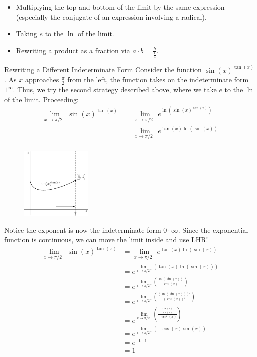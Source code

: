 \begin{itemize}
\item Multiplying the top and bottom of the limit by the same expression (especially the conjugate of an expression involving a radical).
\item Taking $e$ to the $\ln$ of the limit.
\item Rewriting a product as a fraction via $a\cdot b = \frac{b}{\frac{1}{a}}$.
\end{itemize}
\begin{example}{Rewriting a Different Indeterminate Form}
 Consider the function $\sin(x)^{\tan(x)}$.  As $x$ approaches $\frac{\pi}{2}$ from the left, the function takes on the indeterminate form $1^\infty$.  Thus, we try the second strategy described above, where we take $e$ to the $\ln$ of the limit.  Proceeding:
 \begin{align*}
 \lim_{x\rightarrow \pi/2^-}\sin(x)^{\tan(x)}&= \lim_{x\rightarrow \pi/2^-}e^{\ln\left(\sin(x)^{\tan(x)}\right)}\\
 &=\lim_{x\rightarrow \pi/2^-}e^{\tan(x)\ln\left(\sin(x)\right)}\\
 \end{align*}
 
\begin{figure}
 \begin{center}
 	\includegraphics[width=0.3\textwidth]{ChapterGeom/Figures/LHR-SinetoTan}
 \end{center}
\end{figure}

Notice the exponent is now the indeterminate form $0\cdot\infty$.  Since the exponential function is continuous, we can move the limit inside and use LHR!
\begin{align*}
 \lim_{x\rightarrow \pi/2^-}\sin(x)^{\tan(x)}
 &=\lim_{x\rightarrow \pi/2^-}e^{\tan(x)\ln\left(\sin(x)\right)}\\
 &=e^{\lim_{x\rightarrow \pi/2^-}\left(\tan(x)\ln\left(\sin(x)\right)\right)}\\
 &=e^{\lim_{x\rightarrow \pi/2^-}\left(\frac{\ln\left(\sin(x)\right)}{\cot(x)}\right)}\\
 &=e^{\lim_{x\rightarrow \pi/2^-}\left(\frac{\left(\ln\left(\sin(x)\right)\right)'}{\left(\cot(x)\right)'}\right)}\\
 &=e^{\lim_{x\rightarrow \pi/2^-}\left(\frac{\frac{\cos(x)}{\sin(x)}}{-\csc^2(x)}\right)}\\
 &=e^{\lim_{x\rightarrow \pi/2^-}\left(-\cos(x)\sin(x)\right)}\\
 &=e^{-0\cdot 1}\\
 &=1
 \end{align*}
\end{example}
